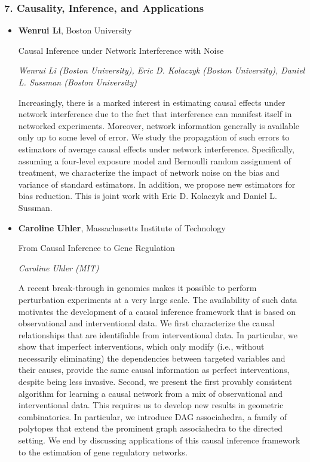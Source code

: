 \subsubsection*{7. Causality, Inference, and Applications}

\begin{itemize}
\item \textbf{Wenrui Li}, Boston University

Causal Inference under Network Interference with Noise

\emph{\footnotesize Wenrui Li (Boston University), Eric D. Kolaczyk (Boston University), Daniel L. Sussman (Boston University)}

Increasingly, there is a marked interest in estimating causal effects under network interference due to the fact that interference can manifest itself in networked experiments. Moreover, network information generally is available only up to some level of error. We study the propagation of such errors to estimators of average causal effects under network interference. Specifically, assuming a four-level exposure model and Bernoulli random assignment of treatment, we characterize the impact of network noise on the bias and variance of standard estimators. In addition, we propose new estimators for bias reduction. This is joint work with Eric D. Kolaczyk and Daniel L. Sussman.


\item \textbf{Caroline Uhler}, Massachusetts Institute of Technology

From Causal Inference to Gene Regulation

\emph{\footnotesize Caroline Uhler (MIT)}

A recent break-through in genomics makes it possible to perform perturbation experiments at a very large scale. The availability of such data motivates the development of a causal inference framework that is based on observational and interventional data. We first characterize the causal relationships that are identifiable from interventional data. In particular, we show that imperfect interventions, which only modify (i.e., without necessarily eliminating) the dependencies between targeted variables and their causes, provide the same causal information as perfect interventions, despite being less invasive. Second, we present the first provably consistent algorithm for learning a causal network from a mix of observational and interventional data. This requires us to develop new results in geometric combinatorics. In particular, we introduce DAG associahedra, a family of polytopes that extend the prominent graph associahedra to the directed setting. We end by discussing applications of this causal inference framework to the estimation of gene regulatory networks. 



\end{itemize}
